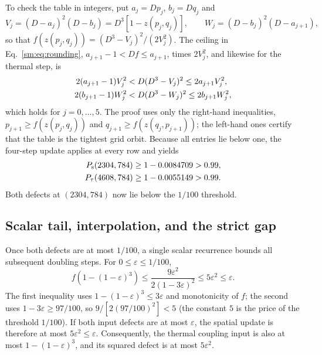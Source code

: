 To check the table in integers, put $a_j=Dp_j$, $b_j=Dq_j$ and
\begin{equation}
 V_j=(D-a_j)^2(D-b_j)=D^3[1-z(p_j,q_j)],\qquad
 W_j=(D-b_j)^2(D-a_{j+1}),
 \label{sm:eq:integer-products}
\end{equation}
so that $f(z(p_j,q_j))=(D^3-V_j)^2/(2V_j^2)$. The ceiling in
Eq.~\eqref{sm:eq:rounding}, $a_{j+1}-1<Df\le a_{j+1}$, times $2V_j^2$,
and likewise for the thermal step, is
\begin{align}
 2(a_{j+1}-1)V_j^2
 &<D(D^3-V_j)^2\le2a_{j+1}V_j^2, \notag\\
 2(b_{j+1}-1)W_j^2
 &<D(D^3-W_j)^2\le2b_{j+1}W_j^2,
 \label{sm:eq:integer-check}
\end{align}
which holds for $j=0,\ldots,5$. The proof uses only the right-hand
inequalities, $p_{j+1}\ge f(z(p_j,q_j))$ and
$q_{j+1}\ge f(z(q_j,p_{j+1}))$; the left-hand ones certify that the
table is the tightest grid orbit.
Because all entries lie below one, the four-step update applies at every
row and yields
\begin{align}
 P_{\mathrm s}(2304,784)&\ge1-0.0084709>0.99,\notag \\
 P_{\tau}(4608,784)&\ge1-0.0055149>0.99.
 \label{sm:eq:terminal}
\end{align}
Both defects at $(2304,784)$ now lie below the $1/100$ threshold.

\subsection{Scalar tail, interpolation, and the strict gap}
\label{sm:sec:gap}

Once both defects are at most $1/100$, a single scalar recurrence bounds
all subsequent doubling steps. For $0\le\varepsilon\le1/100$,
\begin{equation}
 f(1-(1-\varepsilon)^3)
 \le\frac{9\varepsilon^2}{2(1-3\varepsilon)^2}
 \le5\varepsilon^2\le\varepsilon.
 \label{sm:eq:scalar}
\end{equation}
The first inequality uses
$1-(1-\varepsilon)^3\le3\varepsilon$ and monotonicity of $f$;
the second uses $1-3\varepsilon\ge97/100$, so $9/[2(97/100)^2]<5$ (the
constant $5$ is the price of the threshold $1/100$).
If both input defects are at most $\varepsilon$, the spatial update
is therefore at most $5\varepsilon^2\le\varepsilon$.
Consequently, the thermal coupling input is also at most
$1-(1-\varepsilon)^3$, and its squared defect is at most
$5\varepsilon^2$.

